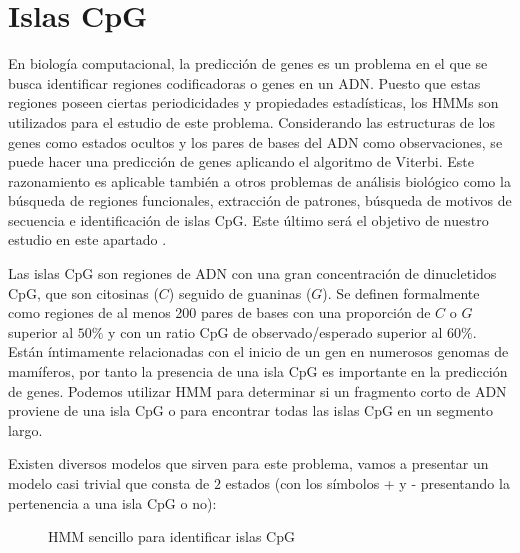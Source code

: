 \section{Islas CpG}
En biología computacional, la predicción de genes es un problema en el que se busca identificar regiones codificadoras o genes en un ADN. Puesto que estas regiones poseen ciertas periodicidades y propiedades estadísticas, los HMMs son utilizados para el estudio de este problema. Considerando las estructuras de los genes como estados ocultos y los pares de bases del ADN como observaciones, se puede hacer una predicción de genes aplicando el algoritmo de Viterbi. Este razonamiento es aplicable también a otros problemas de análisis biológico como la búsqueda de regiones funcionales, extracción de patrones, búsqueda de motivos de secuencia e identificación de islas CpG. Este último será el objetivo de nuestro estudio en este apartado \cite{bioStudies}.

Las islas CpG son regiones de ADN con una gran concentración de dinucletidos CpG, que son citosinas ($C$) seguido de guaninas ($G$). Se definen formalmente como regiones de al menos 200 pares de bases con una proporción de $C$ o $G$ superior al $50\%$ y con un ratio CpG de observado/esperado superior al $60\%$. Están íntimamente relacionadas con el inicio de un gen en numerosos genomas de mamíferos, por tanto la presencia de una isla CpG es importante en la predicción de genes. Podemos utilizar HMM para determinar si un fragmento corto de ADN proviene de una isla CpG o para encontrar todas las islas CpG en un segmento largo.

Existen diversos modelos que sirven para este problema, vamos a presentar un modelo casi trivial que consta de $2$ estados (con los símbolos + y - presentando la pertenencia a una isla CpG o no):

\begin{figure}[H]
\centering
{}
\caption{HMM sencillo para identificar islas CpG \cite{bioStudies}}
\end{figure}

